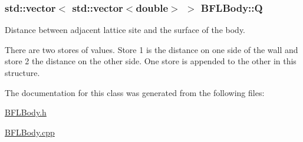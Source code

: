 \subsubsection[{\texorpdfstring{Q}{Q}}]{\setlength{\rightskip}{0pt plus 5cm}std\+::vector$<$ std\+::vector$<$double$>$ $>$ B\+F\+L\+Body\+::Q\hspace{0.3cm}{\ttfamily [protected]}}\hypertarget{class_b_f_l_body_a77b97a6b61e16616ab718c56c3a34622}{}\label{class_b_f_l_body_a77b97a6b61e16616ab718c56c3a34622}


Distance between adjacent lattice site and the surface of the body. 

There are two stores of values. Store 1 is the distance on one side of the wall and store 2 the distance on the other side. One store is appended to the other in this structure. 

The documentation for this class was generated from the following files\+:\begin{DoxyCompactItemize}
\item 
\hyperlink{_b_f_l_body_8h}{B\+F\+L\+Body.\+h}\item 
\hyperlink{_b_f_l_body_8cpp}{B\+F\+L\+Body.\+cpp}\end{DoxyCompactItemize}
